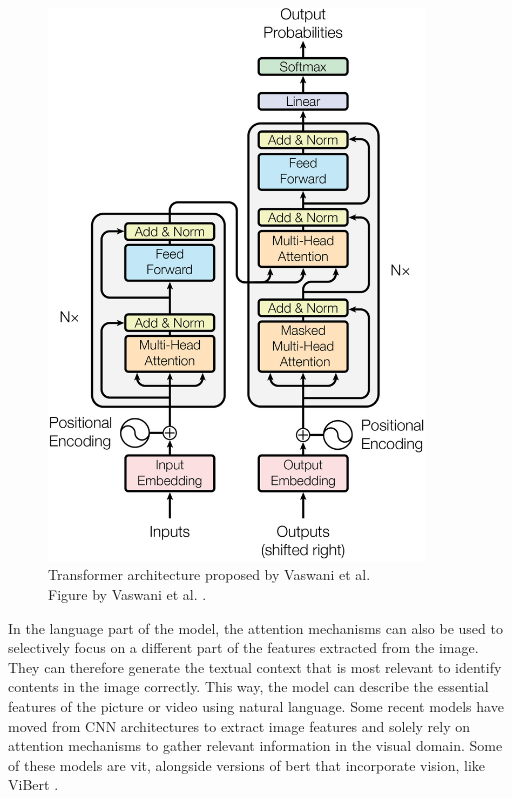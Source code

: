     \begin{figure}[htb]
        \centering
        \centerline{
        \includegraphics[width=10cm]{images/Transformer_architecture.png}}
        \caption[Transformer architecture proposed by Vaswani et al.]{Transformer architecture proposed by Vaswani et al.\\
        Figure by Vaswani et al. \cite{vaswaniAttentionAllYou2017}.}
        \label{fig:transformer_architecture}
    \end{figure}
    
    In the language part of the model, the attention mechanisms can also be used to selectively focus on a different part of the features extracted from the image. They can therefore generate the textual context that is most relevant to identify contents in the image correctly. This way, the model can describe the essential features of the picture or video using natural language. Some recent models have moved from CNN architectures to extract image features and solely rely on attention mechanisms to gather relevant information in the visual domain. Some of these models are \gls{vit}, alongside versions of \gls{bert} that incorporate vision, like ViBert \cite{leiLessMoreClipBERT2021, liVisualBERTSimplePerformant2019, suVLBERTPretrainingGeneric2020}. %

